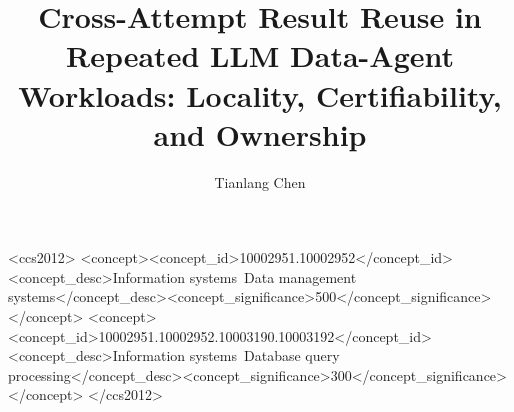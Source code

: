 \documentclass[sigconf,review]{acmart}
\begin{document}
\title{Cross-Attempt Result Reuse in Repeated LLM Data-Agent Workloads: Locality, Certifiability, and Ownership}

\author{Tianlang Chen}

\renewcommand{\shortauthors}{Tianlang Chen}

\begin{abstract}

\end{abstract}

\begin{CCSXML}
<ccs2012>
<concept><concept_id>10002951.10002952</concept_id><concept_desc>Information systems~Data management systems</concept_desc><concept_significance>500</concept_significance></concept>
<concept><concept_id>10002951.10002952.10003190.10003192</concept_id><concept_desc>Information systems~Database query processing</concept_desc><concept_significance>300</concept_significance></concept>
</ccs2012>
\end{CCSXML}


\maketitle











\begin{acks}

\end{acks}



\balance


\end{document}
